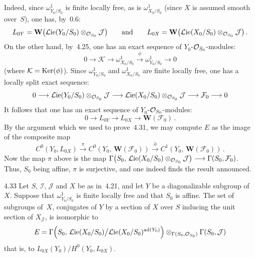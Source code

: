 {\renewcommand{\thefootnote}{(128)}}
Indeed, since \(\omega^{1}_{Y_{0}/S_{0}}\) is finite locally free, as is
\(\omega^{1}_{X_{0}/S_{0}}\) (since \(X\) is assumed smooth over~\(S\)), one
has, by~0.6:
\[
L_{0Y}
=
\mathbf{W}\bigl(\mathcal{L}\mathrm{ie}(Y_{0}/S_{0})\otimes_{\mathcal{O}_{S_{0}}}\mathcal{J}\bigr)
\qquad\text{and}\qquad
L_{0X}
=
\mathbf{W}\bigl(\mathcal{L}\mathrm{ie}(X_{0}/S_{0})\otimes_{\mathcal{O}_{S_{0}}}\mathcal{J}\bigr)\,.
\]
On the other hand, by~4.25, one has an exact sequence of
\(Y_{0}\)-\(\mathcal{O}_{S_{0}}\)-modules:
\[
0\longrightarrow\mathcal{K}\longrightarrow
\omega^{1}_{X_{0}/S_{0}}
\xrightarrow{\phi}
\omega^{1}_{Y_{0}/S_{0}}
\longrightarrow 0
\]
(where \(\mathcal{K}=\operatorname{Ker}(\phi)\)). Since \(\omega^{1}_{Y_{0}/S_{0}}\) and
\(\omega^{1}_{X_{0}/S_{0}}\) are finite locally free, one has a locally split
exact sequence:
\[
0\longrightarrow
\mathcal{L}\mathrm{ie}(Y_{0}/S_{0})\otimes_{\mathcal{O}_{S_{0}}}\mathcal{J}
\longrightarrow
\mathcal{L}\mathrm{ie}(X_{0}/S_{0})\otimes_{\mathcal{O}_{S_{0}}}\mathcal{J}
\longrightarrow
\mathcal{F}_{0}
\longrightarrow 0
\]
It follows that one has an exact sequence of
\(Y_{0}\)-\(\mathcal{O}_{S_{0}}\)-modules:
\[
0\longrightarrow L_{0Y}\longrightarrow L_{0X}\longrightarrow\mathbf{W}(\mathcal{F}_{0})\,.
\]
By the argument which we used to prove~4.31, we may compute \(E\) as the
image of the composite map
\[
C^{0}(Y_{0},L_{0X})
\xrightarrow{\pi}
C^{0}(Y_{0},\,\mathbf{W}(\mathcal{F}_{0}))
\xrightarrow{\partial}
C^{1}(Y_{0},\,\mathbf{W}(\mathcal{F}_{0}))\,.
\]
Now the map \(\pi\) above is the map
\(\Gamma\bigl(S_{0},\,
\mathcal{L}\mathrm{ie}(X_{0}/S_{0})\otimes_{\mathcal{O}_{S_{0}}}\mathcal{J}\bigr)
\longrightarrow\Gamma(S_{0},\mathcal{F}_{0})\).
Thus, \(S_{0}\) being affine, \(\pi\) is surjective, and one indeed finds the
result announced.

\begin{corollary}{4.33}\label{III.4.33}
Let \(S\), \(\mathcal{I}\), \(\mathcal{J}\) and \(X\) be as in~4.21, and let
\(Y\) be a diagonalizable subgroup of~\(X\). Suppose that
\(\omega^{1}_{Y_{0}/S_{0}}\) is finite locally free and that \(S_{0}\) is
affine.%
{\renewcommand{\thefootnote}{(129)}}
The set of subgroups of~\(X\), conjugates of \(Y\) by a section of \(X\)
over \(S\) inducing the unit section of \(X_{\mathcal{J}}\), is isomorphic to
\[
E
=
\Gamma\Bigl(S_{0},\,
\mathcal{L}\mathrm{ie}(X_{0}/S_{0})
\big/
\mathcal{L}\mathrm{ie}(X_{0}/S_{0})^{\mathrm{ad}(Y_{0})}
\Bigr)
\otimes_{\Gamma(S_{0},\mathcal{O}_{S_{0}})}
\Gamma(S_{0},\mathcal{J})
\]
{\renewcommand{\thefootnote}{(130)}}
that is, to \(L_{0X}(Y_{0})/H^{0}(Y_{0},L_{0X})\).
\end{corollary}

